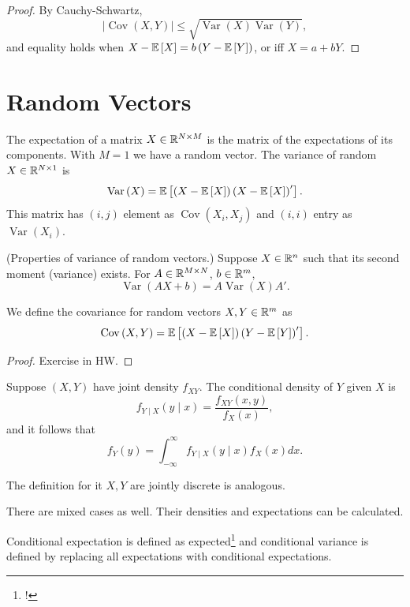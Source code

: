 \begin{proof}
	By Cauchy-Schwartz, \[
		\left| \operatorname{Cov}\left(X,Y\right) \right| \le \sqrt{\operatorname{Var}\left(X\right)\operatorname{Var}\left(Y\right)}
		,\] and equality holds when $X - \mathbb{E}\left[X\right] = b\left( Y - \mathbb{E}\left[Y\right]  \right)$, or iff $X = a +  bY$.
\end{proof}

\section{Random Vectors}

The expectation of a matrix $X \in \mathbb{R}^{N \times M}$ is the matrix of the expectations of its components. With $M=1$ we have a random vector. The variance of random $X \in \mathbb{R}^{N \times 1}$ is \[
	\operatorname{Var}\left(X\right) = \mathbb{E}\left[\left( X-\mathbb{E}\left[X\right]  \right)\left( X - \mathbb{E}\left[X\right]  \right)'\right]
	.\] This matrix has $(i,j)$ element as $\operatorname{Cov}\left(X_i,X_j\right)$ and $(i,i)$ entry as $\operatorname{Var}\left(X_i\right).$

\begin{remark}	(Properties of variance of random vectors.) Suppose $X \in \mathbb{R}^n$ such that its second moment (variance) exists. For $A \in \mathbb{R}^{M \times  N}$, $b \in \mathbb{R}^m$, \[
		\operatorname{Var}\left(AX + b\right) = A \operatorname{Var}\left(X\right)A'
		.\]

	We define the covariance for random vectors $X,Y \in \mathbb{R}^m$ as \[
		\operatorname{Cov}\left(X,Y\right) = \mathbb{E}\left[\left( X - \mathbb{E}\left[X\right]  \right)\left( Y - \mathbb{E}\left[Y\right]  \right)'\right]
		.\]
\end{remark}

\begin{proof}
	Exercise in HW.
\end{proof}

\begin{definition}
	Suppose $(X,Y)$ have joint density $f_{XY}$. The conditional density of $Y$ given $X$ is \[
		f_{Y \mid X} (y \mid x) = \frac{f_{XY}(x,y)}{f_X(x)}
		,\] and it follows that \[
		f_Y(y) = \int_{-\infty}^{\infty} f_{Y \mid X}(y\mid x) f_X(x) dx
		.\]

	The definition for it $X,Y$ are jointly discrete is analogous.

	There are mixed cases as well. Their densities and expectations can be calculated.

	Conditional expectation is defined as expected\footnote{!} and conditional variance is defined by replacing all expectations with conditional expectations.
\end{definition}

